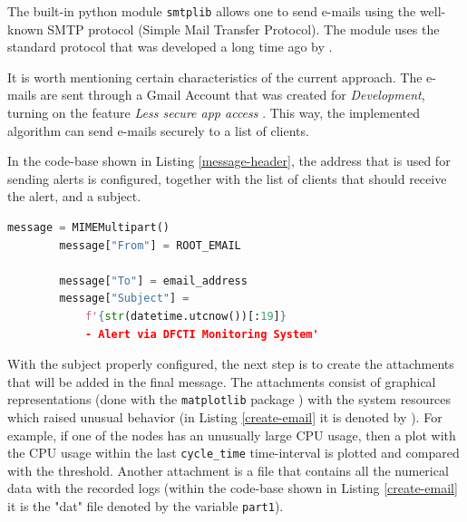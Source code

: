 \documentclass[conference]{IEEEtran}
\begin{document}
The built-in python module \texttt{smtplib} \cite{smtplib} allows one to send e-mails using the well-known SMTP protocol (Simple Mail Transfer Protocol). The module uses the standard protocol that was developed a long time ago by \cite{postel1982rfc0821}.
\par It is worth mentioning certain characteristics of the current approach. The e-mails are sent through a Gmail Account that was created for \emph{Development}, turning on the feature \emph{Less secure app access} \cite{less-secure}. This way, the implemented algorithm can send e-mails securely to a list of clients.
\par In the code-base shown in Listing \ref{message-header}, the address that is used for sending alerts is configured, together with the list of clients that should receive the alert, and a subject.

\begin{lstlisting}[language=Python, caption={Setting up the e-mail headers, such as the destination and subject.},basicstyle=\footnotesize,label={message-header}]
 message = MIMEMultipart()
        message["From"] = ROOT_EMAIL
        
        message["To"] = email_address
        message["Subject"] = 
            f'{str(datetime.utcnow())[:19]}
            - Alert via DFCTI Monitoring System'
\end{lstlisting}

With the subject properly configured, the next step is to create the attachments that will be added in the final message. The attachments consist of graphical representations (done with the \texttt{matplotlib} package \cite{hunter2007matplotlib}) with the system resources which raised unusual behavior (in Listing \ref{create-email} it is denoted by ). For example, if one of the nodes has an unusually large CPU usage, then a plot with the CPU usage within the last \texttt{cycle\_time} time-interval is plotted and compared with the threshold. Another attachment is a file that contains all the numerical data with the recorded logs (within the code-base shown in Listing \ref{create-email} it is the "dat" file denoted by the variable \texttt{part1}).
\end{document}
